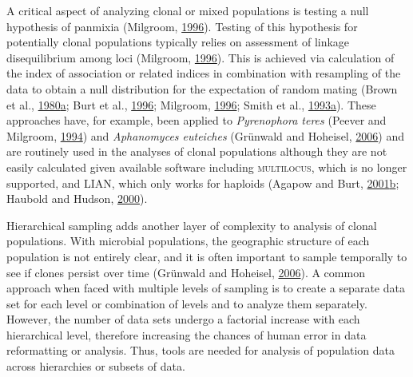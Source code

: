 \documentclass[double,12pt]{beavtex}
\begin{document}
  A critical aspect of analyzing clonal or mixed populations is testing a
  null hypothesis of panmixia (Milgroom,
  \protect\hyperlink{ref-milgroom1996recombination}{1996}). Testing of
  this hypothesis for potentially clonal populations typically relies on
  assessment of linkage disequilibrium among loci (Milgroom,
  \protect\hyperlink{ref-milgroom1996recombination}{1996}). This is
  achieved via calculation of the index of association or related indices
  in combination with resampling of the data to obtain a null distribution
  for the expectation of random mating (Brown et al.,
  \protect\hyperlink{ref-Brown:1980}{1980}\protect\hyperlink{ref-Brown:1980}{a};
  Burt et al., \protect\hyperlink{ref-burt1996molecular}{1996}; Milgroom,
  \protect\hyperlink{ref-milgroom1996recombination}{1996}; Smith et al.,
  \protect\hyperlink{ref-Smith:1993}{1993}\protect\hyperlink{ref-Smith:1993}{a}).
  These approaches have, for example, been applied to \emph{Pyrenophora
  teres} (Peever and Milgroom,
  \protect\hyperlink{ref-peever1994genetic}{1994}) and \emph{Aphanomyces
  euteiches} (Grünwald and Hoheisel,
  \protect\hyperlink{ref-Grunwald:2006}{2006}) and are routinely used in
  the analyses of clonal populations although they are not easily
  calculated given available software including \textsc{multilocus}, which
  is no longer supported, and \textsc{LIAN}, which only works for haploids
  (Agapow and Burt,
  \protect\hyperlink{ref-Agapow:2001}{2001}\protect\hyperlink{ref-Agapow:2001}{b};
  Haubold and Hudson, \protect\hyperlink{ref-Haubold:2000}{2000}).
  
  Hierarchical sampling adds another layer of complexity to analysis of
  clonal populations. With microbial populations, the geographic structure
  of each population is not entirely clear, and it is often important to
  sample temporally to see if clones persist over time (Grünwald and
  Hoheisel, \protect\hyperlink{ref-Grunwald:2006}{2006}). A common
  approach when faced with multiple levels of sampling is to create a
  separate data set for each level or combination of levels and to analyze
  them separately. However, the number of data sets undergo a factorial
  increase with each hierarchical level, therefore increasing the chances
  of human error in data reformatting or analysis. Thus, tools are needed
  for analysis of population data across hierarchies or subsets of data.
  
\end{document}
